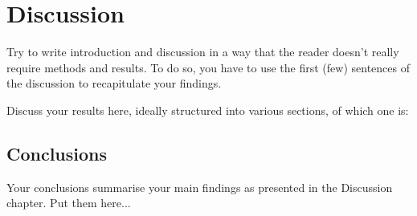 \chapter{Discussion}
\label{ch:discussion}

Try to write introduction and discussion in a way that the reader doesn't really require methods and results. To do so, you have to use the first (few) sentences of the discussion to recapitulate your findings.

Discuss your results here, ideally structured into various sections, of which one is:


\section{Conclusions}
\label{sec:conclusions}

  Your conclusions summarise your main findings as presented in the
  Discussion chapter. Put them here...

